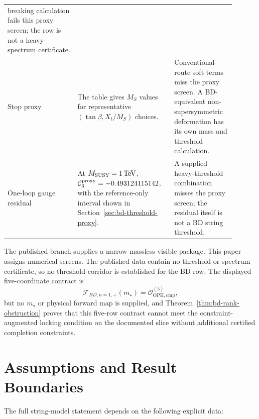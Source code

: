 \documentclass[11pt]{article}
\theoremstyle{remark}
\theoremstyle{plain}
\newcommand{\OPH}{\mathrm{OPH}}
\newcommand{\calF}{\mathcal F}
\newcommand{\calO}{\mathcal O}
\begin{document}
\begin{longtable}{L{0.29\linewidth}L{0.37\linewidth}L{0.24\linewidth}}
breaking calculation fails this proxy screen; the row is not a heavy-spectrum certificate. \\
Stop proxy & The table gives \(M_S\) values for representative
\((\tan\beta,X_t/M_S)\) choices. & Conventional-route soft terms miss the proxy screen. A
BD-equivalent non-supersymmetric deformation has its own mass and threshold calculation. \\
One-loop gauge residual & At \(M_{\rm SUSY}=1\,\mathrm{TeV}\),
\(\mathcal C_3^{\rm proxy}=-0.493124115142\), with the reference-only interval shown in
Section~\ref{sec:bd-threshold-proxy}. & A supplied heavy-threshold combination misses the proxy
screen; the residual itself is not a BD string threshold. \\
\bottomrule
\end{longtable}

The published branch supplies a narrow massless visible package. This paper assigns numerical
screens. The published data contain no threshold or spectrum certificate, so no threshold corridor is
established
for the BD row. The displayed five-coordinate contract is
\[
\calF_{BD,n=1,+}(m_\star)=\calO_{\OPH,\mathrm{cmp}}^{(5)},
\]
but no \(m_\star\) or physical forward map is supplied, and Theorem~\ref{thm:bd-rank-obstruction}
proves that this five-row contract cannot meet the constraint-augmented locking condition on the
documented slice without additional certified completion constraints.

\section{Assumptions and Result Boundaries}\label{sec:claim-gates}

The full string-model statement depends on the following explicit data:
\end{document}

